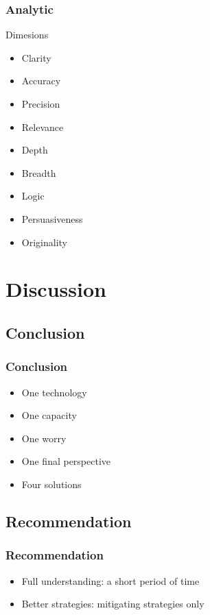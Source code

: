\documentclass{beamer}
\begin{document}
\begin{frame}
    \frametitle{Analytic}
    \begin{block}{Dimesions}
        \LARGE
        \begin{multicols}{3}
            \begin{itemize}
                \item<1-> Clarity
                \item<1-> Accuracy
                \item<1-> Precision
                \item<2-> Relevance
                \item<2-> Depth
                \item<2-> Breadth
                \item<3-> Logic
                \item<3-> Persuasiveness
                \item<3-> Originality
            \end{itemize}
        \end{multicols}
    \end{block}
\end{frame}

\section{Discussion}

\subsection{Conclusion}
\begin{frame}
    \frametitle{Conclusion}
    \Large
    \begin{itemize}
        \item<1-> One technology
        \item<2-> One capacity
        \item<3-> One worry
        \item<4-> One final perspective
        \item<5-> Four solutions
    \end{itemize}
\end{frame}

\subsection{Recommendation}

\begin{frame}
    \frametitle{Recommendation}
    \LARGE
    \begin{itemize}[<+->]
        \item Full understanding: a short period of time
        \item Better strategies: mitigating strategies only
    \end{itemize}
\end{frame}
\end{document}

